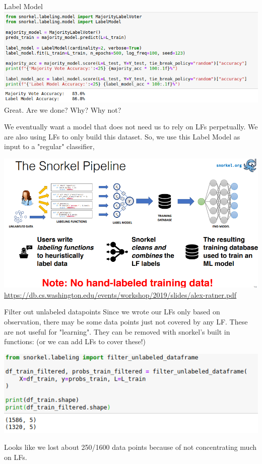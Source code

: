\documentclass{beamer}
\begin{document}
\begin{frame}{Label Model}
    \includegraphics[width=\textwidth]{figures/labelmodel.png}
    Great. Are we done? Why? Why not? 
    
    \pause We eventually want a model that does not need us to rely on LFs perpetually. We are also using LFs to only build this dataset. So, we use this Label Model as input to a "regular" classifier, 
\end{frame} 

\begin{frame}{}
    \includegraphics[width=\textwidth]{figures/snorkelradiologyexample.PNG}
    \href{Source}{https://db.cs.washington.edu/events/workshop/2019/slides/alex-ratner.pdf}
\end{frame}

\begin{frame}{Filter out unlabeled datapoints}
    Since we wrote our LFs only based on observation, there may be some data points just not covered by any LF. These are not useful for "learning". They can be removed with snorkel's built in functions: (or we can add LFs to cover these!)
    
    \includegraphics[width=\textwidth]{figures/filteroutunlabeled.png}

    Looks like we lost about 250/1600 data points because of not concentrating much on LFs. 
\end{frame}
\end{document}
